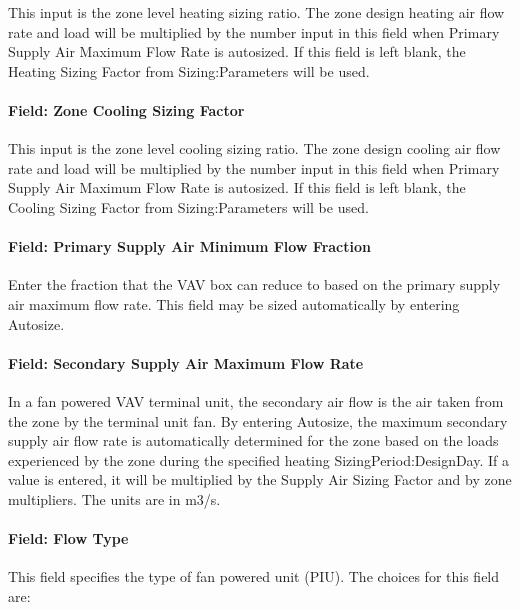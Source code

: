 This input is the zone level heating sizing ratio. The zone design heating air flow rate and load will be multiplied by the number input in this field when Primary Supply Air Maximum Flow Rate is autosized. If this field is left blank, the Heating Sizing Factor from Sizing:Parameters will be used.

\paragraph{Field: Zone Cooling Sizing Factor}\label{field-zone-cooling-sizing-factor-7}

This input is the zone level cooling sizing ratio. The zone design cooling air flow rate and load will be multiplied by the number input in this field when Primary Supply Air Maximum Flow Rate is autosized. If this field is left blank, the Cooling Sizing Factor from Sizing:Parameters will be used.

\paragraph{Field: Primary Supply Air Minimum Flow Fraction}\label{field-primary-supply-air-minimum-flow-fraction}

Enter the fraction that the VAV box can reduce to based on the primary supply air maximum flow rate. This field may be sized automatically by entering Autosize.

\paragraph{Field: Secondary Supply Air Maximum Flow Rate}\label{field-secondary-supply-air-maximum-flow-rate}

In a fan powered VAV terminal unit, the secondary air flow is the air taken from the zone by the terminal unit fan. By entering Autosize, the maximum secondary supply air flow rate is automatically determined for the zone based on the loads experienced by the zone during the specified heating SizingPeriod:DesignDay. If a value is entered, it will be multiplied by the Supply Air Sizing Factor and by zone multipliers. The units are in m3/s.

\paragraph{Field: Flow Type}\label{field-flow-type}

This field specifies the type of fan powered unit (PIU). The choices for this field are:


